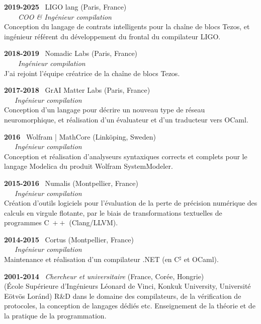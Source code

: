\documentclass[a4paper,11pt]{article}
\newcommand{\cpp}{\mbox{C \hspace*{-2.5mm} \raise 0.7mm \hbox{${\scriptscriptstyle ++}$}}}
\begin{document}
\bigskip

\noindent\textbf{2019-2025} \ \textsf{LIGO lang} (Paris,
France)\\ \ \ \ \ \emph{COO \& Ingénieur compilation}\\ Conception du
langage de contrats intelligents pour la chaîne de blocs Tezos, et
ingénieur référent du développement du frontal du compilateur LIGO.

\bigskip

\noindent\textbf{2018-2019} \ \textsf{Nomadic Labs} (Paris,
  France)\\ \ \ \ \ \emph{Ingénieur compilation}\\ J'ai rejoint
  l'équipe créatrice de la chaîne de blocs Tezos.

\bigskip

\noindent\textbf{2017-2018} \ \textsf{GrAI Matter Labs} (Paris,
France)\\ \ \ \ \emph{Ingénieur compilation}\\ Conception d'un langage
pour décrire un nouveau type de réseau neuromorphique, et réalisation
d'un évaluateur et d'un traducteur vers OCaml.

\newpage

\noindent\textbf{2016} \ \textsf{Wolfram | MathCore} (Link\"oping,
Sweden)\\ \ \ \ \emph{Ingénieur compilation}\\ Conception et
réalisation d'analyseurs syntaxiques corrects et complets pour le
langage Modelica du produit Wolfram SystemModeler.

\bigskip

\noindent\textbf{2015-2016} \ \textsf{Numalis} (Montpellier,
France)\\ \ \ \ \emph{Ingénieur compilation}\\ Création d'outils
logiciels pour l'évaluation de la perte de précision numérique des
calculs en virgule flotante, par le biais de transformations
textuelles de programmes \cpp{} (Clang/LLVM).

\bigskip

\noindent\textbf{2014-2015} \ \textsf{Cortus} (Montpellier,
France)\\ \ \ \ \emph{Ingénieur compilation}\\ Maintenance et
réalisation d'un compilateur .NET (en C$^\sharp$ et OCaml).

\bigskip

\noindent\textbf{2001-2014} \ \textsf{\emph{Chercheur et
  universitaire}} (France, Corée, Hongrie)\\ (\textsf{École
  Supérieure d'Ingénieurs Léonard de Vinci}, \textsf{Konkuk
  University}, \textsf{Université E\"otv\"os Lor\'and}) R\&D dans le
domaine des compilateurs, de la vérification de protocoles, la
conception de langages dédiés etc. Enseignement de la théorie et de la
pratique de la programmation.
\end{document}

